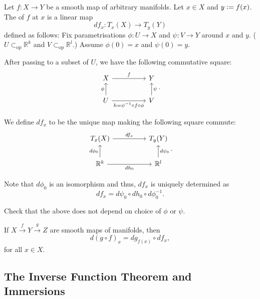 \documentclass[12pt]{article}
\newcommand{\opsub}{\subset_{\operatorname{op}}}
\begin{document}
\begin{defn}
	Let $f : X \to Y$ be a smooth map of arbitrary manifolds. Let $x \in X$ and $y \vcentcolon= f(x)$. The  of $f$ at $x$ is a linear map
	\begin{equation*} 
		df_{x} : T_{x}(X) \to T_{y}(Y)
	\end{equation*}
	defined as follows: Fix parametrisations $\phi : U \to X$ and $\psi : V \to Y$ around $x$ and $y$. ($U \opsub \mathbb{R}^{k}$ and $V \opsub \mathbb{R}^{l}$.) Assume $\phi(0) = x$ and $\psi(0) = y$.

	After passing to a subset of $U$, we have the following commutative square:
	\begin{equation*} 
		\begin{tikzcd}
			X \arrow[rr, "f"] & & Y \\
			U \arrow[u, "\phi"] \arrow[rr, "h = \psi^{-1} \circ f \circ \phi"'] & & V \arrow[u, "\psi"']
		\end{tikzcd}.
	\end{equation*}

	We define $df_{x}$ to be the unique map making the following square commute:
	\begin{equation*} 
		\begin{tikzcd}
			T_{x}(X) \arrow[rr, "df_{x}"] & & T_{y}(Y) \\
			\mathbb{R}^{k} \arrow[u, "d\phi_{0}"] \arrow[rr, "dh_{0}"'] & & \mathbb{R}^{l} \arrow[u, "d\psi_{0}"']
		\end{tikzcd}.
	\end{equation*}
\end{defn}
Note that $d\phi_{0}$ is an isomorphism and thus, $df_{x}$ is uniquely determined as
\begin{equation*} 
	df_{x} = d\psi_{0} \circ dh_{0} \circ d\phi_{0}^{-1}.
\end{equation*}

\begin{ex}
	Check that the above does not depend on choice of $\phi$ or $\psi$.
\end{ex}

\begin{thm}
	If $X \xrightarrow{f} Y \xrightarrow{g} Z$ are smooth maps of manifolds, then
	\begin{equation*} 
		d(g \circ f)_{x} = dg_{f(x)} \circ df_{x},
	\end{equation*}
	for all $x \in X$.
\end{thm}

\subsection{The Inverse Function Theorem and Immersions}
\end{document}
